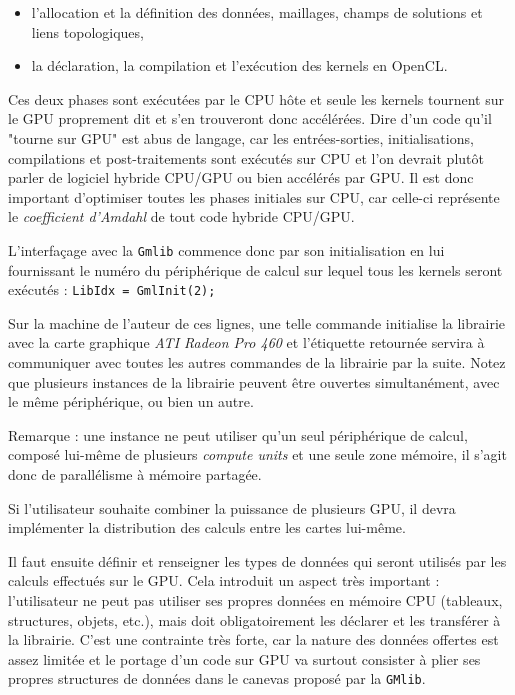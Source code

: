 \documentclass[a4paper,12pt]{article}
\begin{document}
\begin{itemize}
\item l'allocation et la définition des données, maillages, champs de solutions et liens topologiques,
\item la déclaration, la compilation et l'exécution des kernels en OpenCL.
\end{itemize}

Ces deux phases sont exécutées par le CPU hôte et seule les kernels tournent sur le GPU proprement dit et s'en trouveront donc accélérées. Dire d'un code qu'il "tourne sur GPU" est abus de langage, car les entrées-sorties, initialisations, compilations et post-traitements sont exécutés sur CPU et l'on devrait plutôt parler de logiciel hybride CPU/GPU ou bien accélérés par GPU. Il est donc important d'optimiser toutes les phases initiales sur CPU, car celle-ci représente le \emph{coefficient d'Amdahl} de tout code hybride CPU/GPU.

L'interfaçage avec la {\tt Gmlib} commence donc par son initialisation en lui fournissant le numéro du périphérique de calcul sur lequel tous les kernels seront exécutés : {\tt LibIdx = GmlInit(2);}

Sur la machine de l'auteur de ces lignes, une telle commande initialise la librairie avec la carte graphique \emph{ATI Radeon Pro 460} et l'étiquette retournée servira à communiquer avec toutes les autres commandes de la librairie par la suite.
Notez que plusieurs instances de la librairie peuvent être ouvertes simultanément, avec le même périphérique, ou bien un autre.

Remarque : une instance ne peut utiliser qu'un seul périphérique de calcul, composé lui-même de plusieurs \emph{compute units} et une seule zone mémoire, il s'agit donc de parallélisme à mémoire partagée.

Si l'utilisateur souhaite combiner la puissance de plusieurs GPU, il devra implémenter la distribution des calculs entre les cartes lui-même.

Il faut ensuite définir et renseigner les types de données qui seront utilisés par les calculs effectués sur le GPU. Cela introduit un aspect très important : l'utilisateur ne peut pas utiliser ses propres données en mémoire CPU (tableaux, structures, objets, etc.), mais doit obligatoirement les déclarer et les transférer à la librairie. C'est une contrainte très forte, car la nature des données offertes est assez limitée et le portage d'un code sur GPU va surtout consister à plier ses propres structures de données dans le canevas proposé par la {\tt GMlib}.
\end{document}

